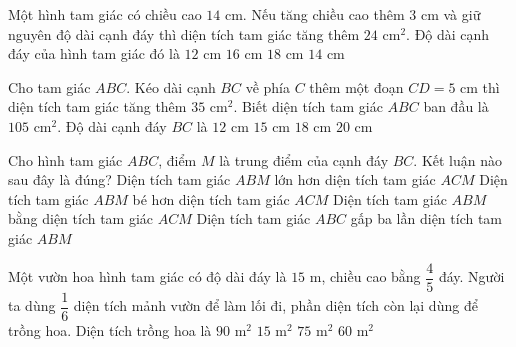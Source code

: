 \begin{ex} %
Một hình tam giác có chiều cao $14\text{ cm}$. Nếu tăng chiều cao thêm $3\text{ cm}$ và giữ nguyên độ dài cạnh đáy thì diện tích tam giác tăng thêm $24\text{ cm}^2$. Độ dài cạnh đáy của hình tam giác đó là
\choice
{$12\text{ cm}$}
{\True $16\text{ cm}$}
{$18\text{ cm}$}
{$14\text{ cm}$}
\end{ex}

\begin{ex} %
Cho tam giác $ABC$. Kéo dài cạnh $BC$ về phía $C$ thêm một đoạn $CD = 5\text{ cm}$ thì diện tích tam giác tăng thêm $35\text{ cm}^2$. Biết diện tích tam giác $ABC$ ban đầu là $105\text{ cm}^2$. Độ dài cạnh đáy $BC$ là
\choice
{$12\text{ cm}$}
{\True $15\text{ cm}$}
{$18\text{ cm}$}
{$20\text{ cm}$}
\end{ex}

\begin{ex} %
Cho hình tam giác $ABC$, điểm $M$ là trung điểm của cạnh đáy $BC$. Kết luận nào sau đây là đúng?
\choice
{Diện tích tam giác $ABM$ lớn hơn diện tích tam giác $ACM$}
{Diện tích tam giác $ABM$ bé hơn diện tích tam giác $ACM$}
{\True Diện tích tam giác $ABM$ bằng diện tích tam giác $ACM$}
{Diện tích tam giác $ABC$ gấp ba lần diện tích tam giác $ABM$}
\end{ex}

\begin{ex} %
Một vườn hoa hình tam giác có độ dài đáy là $15\text{ m}$, chiều cao bằng $\dfrac{4}{5}$ đáy. Người ta dùng $\dfrac{1}{6}$ diện tích mảnh vườn để làm lối đi, phần diện tích còn lại dùng để trồng hoa. Diện tích trồng hoa là
\choice
{$90\text{ m}^2$}
{$15\text{ m}^2$}
{\True $75\text{ m}^2$}
{$60\text{ m}^2$}
\end{ex}

